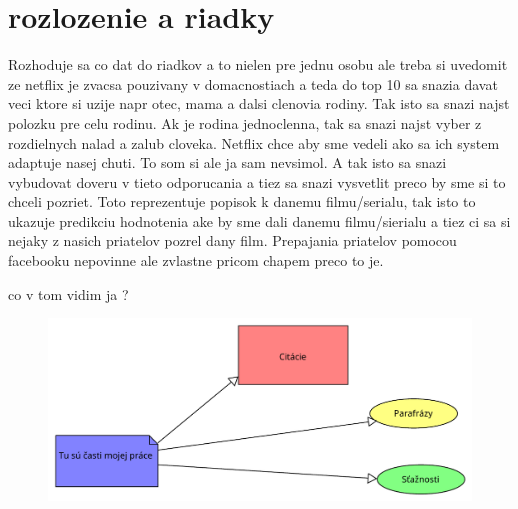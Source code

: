 \documentclass[10pt,twoside,slovak,a4paper]{article}
\begin{document}
\section{rozlozenie a riadky} %
Rozhoduje sa co dat do riadkov a to nielen pre jednu osobu ale treba si uvedomit ze netflix je zvacsa pouzivany v domacnostiach a teda do top 10 sa snazia davat veci ktore si uzije napr otec, mama a dalsi clenovia rodiny. Tak isto sa snazi najst polozku pre celu rodinu. Ak je rodina jednoclenna, tak sa snazi najst vyber z rozdielnych nalad a zalub cloveka.\cite{amatriain2015recommender}
Netflix chce aby sme vedeli ako sa ich system adaptuje nasej chuti. To som si ale ja sam nevsimol. A tak isto sa snazi vybudovat doveru v tieto odporucania a tiez sa snazi vysvetlit preco by sme si to chceli pozriet. Toto reprezentuje popisok k danemu filmu/serialu, tak isto to ukazuje predikciu hodnotenia ake by sme dali danemu filmu/sierialu a tiez ci sa si nejaky z nasich priatelov pozrel dany film.
Prepajania priatelov pomocou facebooku nepovinne ale zvlastne pricom chapem preco to je.

co v tom vidim ja ?



\begin{figure}
	\includegraphics[scale=0.4]{diagram horizontal.pdf}
\end{figure}




\newpage



\begin{figure}
	
\end{figure}
\end{document}
